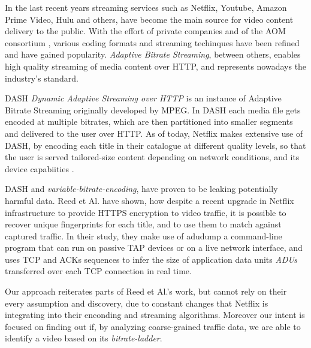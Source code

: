 
In the last recent years streaming services such as Netflix, Youtube, Amazon
Prime Video, Hulu and others, have become the main source for video content
delivery to the public. With the effort of private companies and of the AOM
consortium \cite{aom}, various coding formats and streaming techinques have
been refined and have gained popularity. \textit{Adaptive Bitrate Streaming},
between others, enables high quality streaming of media content over HTTP, and
represents nowadays the industry's standard. 

DASH \textit{Dynamic Adaptive Streaming over HTTP} is an instance of Adaptive
Bitrate Streaming originally developed by MPEG. In DASH each media file gets
encoded at multiple bitrates, which are then partitioned into smaller segments
and delivered to the user over HTTP. As of today, Netflix makes extensive use
of DASH, by encoding each title in their catalogue at different quality levels,
so that the user is served tailored-size content depending on network
conditions, and its device capabiities \cite{per-title-encoding}.

DASH and \emph{variable-bitrate-encoding}, have proven to be leaking
potentially harmful data. Reed et Al. \cite{netflix-real-time} have shown, how
despite a recent upgrade in Netflix infrastructure to provide HTTPS encryption
to video traffic, it is possible to recover unique fingerprints for each title,
and to use them to match against captured traffic. In their study, they make
use of adudump \cite{adudump} a command-line program that can run on passive
TAP devices \cite{tap} or on a live network interface, and uses TCP and ACKs
sequences to infer the size of application data units \emph{ADUs} transferred
over each TCP connection in real time.

Our approach reiterates parts of Reed et Al.'s work, but cannot rely on their
every assumption and discovery, due to constant changes that Netflix is
integrating into their enconding and streaming algorithms. Moreover our intent
is focused on finding out if, by analyzing coarse-grained traffic data, we are
able to identify a video based on its \emph{bitrate-ladder}.

